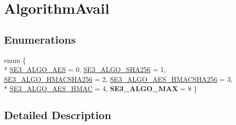 \hypertarget{group___algorithm_avail}{\section{Algorithm\-Avail}
\label{group___algorithm_avail}
}
\subsection*{Enumerations}
\begin{DoxyCompactItemize}
\item 
enum \{ \\*
\hyperlink{group___algorithm_avail_ggae4d5251432e1a9e6803c0240cc492e18ace41ebb9afed9003f5f9351f34c50ec2}{S\-E3\-\_\-\-A\-L\-G\-O\-\_\-\-A\-E\-S} = 0, 
\hyperlink{group___algorithm_avail_ggae4d5251432e1a9e6803c0240cc492e18a33d7aad6188bbd41f98528fdc672d003}{S\-E3\-\_\-\-A\-L\-G\-O\-\_\-\-S\-H\-A256} = 1, 
\hyperlink{group___algorithm_avail_ggae4d5251432e1a9e6803c0240cc492e18a08386119db321e989e1912d27baea464}{S\-E3\-\_\-\-A\-L\-G\-O\-\_\-\-H\-M\-A\-C\-S\-H\-A256} = 2, 
\hyperlink{group___algorithm_avail_ggae4d5251432e1a9e6803c0240cc492e18a5fac4b7b6331499a7277298a8a2edbf4}{S\-E3\-\_\-\-A\-L\-G\-O\-\_\-\-A\-E\-S\-\_\-\-H\-M\-A\-C\-S\-H\-A256} = 3, 
\\*
\hyperlink{group___algorithm_avail_ggae4d5251432e1a9e6803c0240cc492e18adaed4c5a46ddce535c2c0614e1f88c4f}{S\-E3\-\_\-\-A\-L\-G\-O\-\_\-\-A\-E\-S\-\_\-\-H\-M\-A\-C} = 4, 
{\bfseries S\-E3\-\_\-\-A\-L\-G\-O\-\_\-\-M\-A\-X} = 8
 \}
\end{DoxyCompactItemize}


\subsection{Detailed Description}


